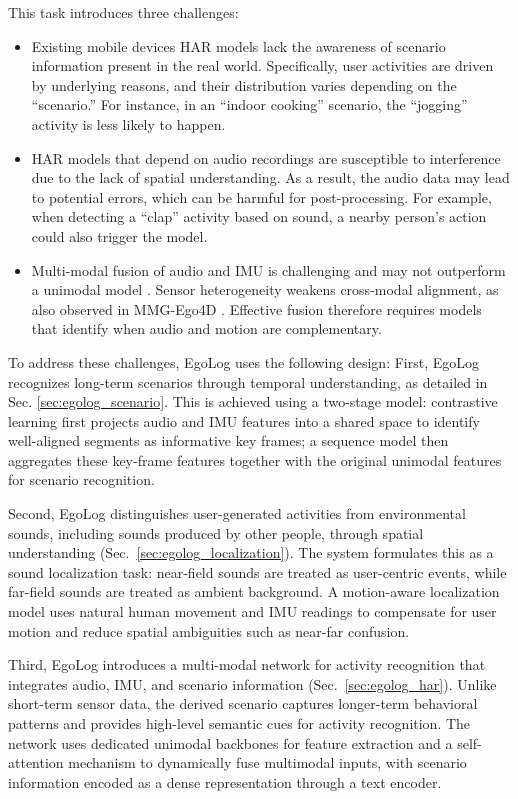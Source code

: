 This task introduces three challenges:
\begin{itemize}
    \item Existing mobile devices HAR models \citep{bhattacharya2022leveraging, gong2023mmg} lack the awareness of scenario information present in the real world. Specifically, user activities are driven by underlying reasons, and their distribution varies depending on the ``scenario.''  For instance, in an ``indoor cooking'' scenario, the ``jogging'' activity is less likely to happen.
    \item HAR models that depend on audio recordings are susceptible to interference due to the lack of spatial understanding. As a result, the audio data may lead to potential errors, which can be harmful for post-processing. For example, when detecting a ``clap'' activity based on sound, a nearby person's action could also trigger the model.
    \item Multi-modal fusion of audio and IMU is challenging and may not outperform a unimodal model \citep{huang2022modality}. Sensor heterogeneity weakens cross-modal alignment, as also observed in MMG-Ego4D \citep{gong2023mmg}. Effective fusion therefore requires models that identify when audio and motion are complementary.
\end{itemize}

To address these challenges, EgoLog uses the following design:
First, EgoLog recognizes long-term scenarios through temporal understanding, as detailed in Sec. \ref{sec:egolog_scenario}. This is achieved using a two-stage model: contrastive learning first projects audio and IMU features into a shared space to identify well-aligned segments as informative key frames; a sequence model then aggregates these key-frame features together with the original unimodal features for scenario recognition.

Second, EgoLog distinguishes user-generated activities from environmental sounds, including sounds produced by other people, through spatial understanding (Sec.~\ref{sec:egolog_localization}). The system formulates this as a sound localization task: near-field sounds are treated as user-centric events, while far-field sounds are treated as ambient background. A motion-aware localization model uses natural human movement and IMU readings to compensate for user motion and reduce spatial ambiguities such as near-far confusion.


Third, EgoLog introduces a multi-modal network for activity recognition that integrates audio, IMU, and scenario information (Sec.~\ref{sec:egolog_har}). Unlike short-term sensor data, the derived scenario captures longer-term behavioral patterns and provides high-level semantic cues for activity recognition.
The network uses dedicated unimodal backbones for feature extraction and a self-attention mechanism to dynamically fuse multimodal inputs, with scenario information encoded as a dense representation through a text encoder.

